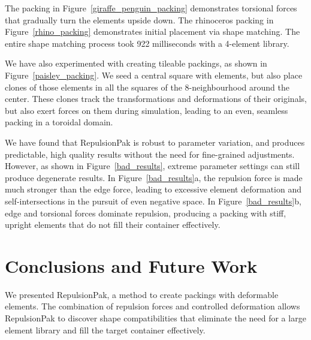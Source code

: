 The packing in Figure~\ref{giraffe_penguin_packing} demonstrates torsional forces
that gradually turn the elements upside down. 
The rhinoceros packing in Figure~\ref{rhino_packing} demonstrates initial placement via shape matching.
The entire shape matching process took 922 milliseconds with a 4-element library.

We have also experimented with creating tileable packings, as shown
in Figure~\ref{paisley_packing}.  We seed a central square with elements,
but also place clones of those elements in all the squares of the
8-neighbourhood around the center.  These clones track the transformations
and deformations of their originals, but also exert forces on them during
simulation, leading to an even, seamless packing in a toroidal domain.

We have found that RepulsionPak is robust to parameter variation, and 
produces predictable, high quality results without the need for fine-grained
adjustments.  However, as shown in Figure~\ref{bad_results}, extreme parameter 
settings can still produce degenerate results.
In Figure~\ref{bad_results}a, the repulsion force is made much stronger than 
the edge force, leading to excessive element deformation and
self-intersections in the pursuit of even negative space.  In 
Figure~\ref{bad_results}b, edge and torsional forces dominate repulsion,
producing a packing with stiff, upright elements that do not fill their
container effectively.


\section{Conclusions and Future Work}
\label{repulsionpak_conclusions_and_future_work}



We presented RepulsionPak, a method to create packings with deformable elements.
The combination of repulsion forces and controlled deformation
allows RepulsionPak to discover shape compatibilities that
eliminate the need for a large element library
and fill the target container effectively.

